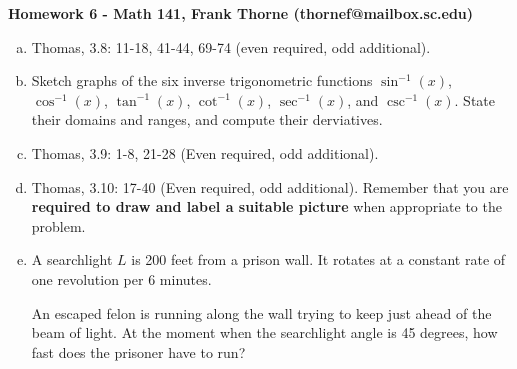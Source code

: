 \documentclass[12pt]{article}
\begin{document}
\setlength{\topmargin}{-2mm}





\begin{center}{\bf Homework 6 - Math 141, Frank Thorne (thornef@mailbox.sc.edu)}
\end{center}

\begin{enumerate}[(a)]

\item
Thomas, 3.8: 11-18, 41-44, 69-74 (even required, odd additional).

\item
Sketch graphs of the six inverse trigonometric functions
$\sin^{-1}(x)$, $\cos^{-1}(x)$, $\tan^{-1}(x)$, $\cot^{-1}(x)$,
$\sec^{-1}(x)$, and $\csc^{-1}(x)$. State their domains and ranges,
and compute their derviatives.

\item
Thomas, 3.9: 1-8, 21-28 (Even required, odd additional).

\item
Thomas, 3.10: 17-40 (Even required, odd additional). Remember that 
you are {\bf required to draw and label a suitable picture} when appropriate
to the problem. 

\item
A searchlight $L$ is 200 feet from a prison wall. It rotates at a constant
rate of one revolution per 6 minutes. 

An escaped felon is running along the wall trying to keep just ahead of the beam
of light. At the moment when the searchlight angle is 45 degrees, how fast does
the prisoner have to run?


\end{enumerate}
\end{document}

